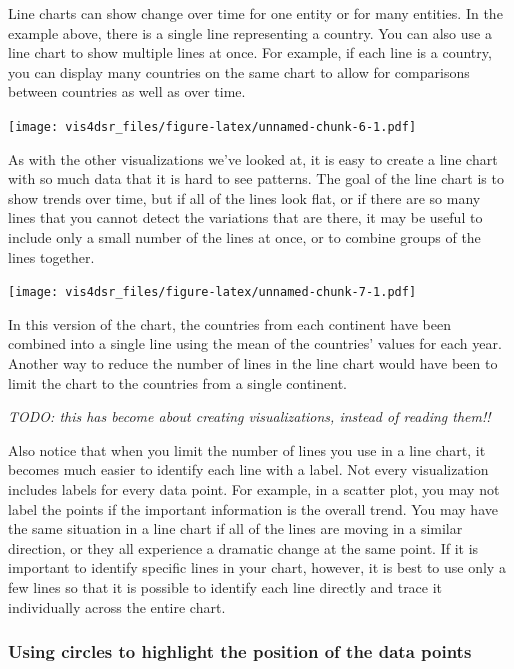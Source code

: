 \documentclass[
]{krantz}
\begin{document}
Line charts can show change over time for one entity or for many entities. In the example
above, there is a single line representing a country. You can also use a line chart
to show multiple lines at once. For example, if each line is a country, you can display
many countries on the same chart to allow for comparisons between countries as well as
over time.

\texttt{[image: vis4dsr\_files/figure-latex/unnamed-chunk-6-1.pdf]}

As with the other visualizations we've looked at, it is easy to create a line chart
with so much data that it is hard to see patterns. The goal of the line chart is to
show trends over time, but if all of the lines look flat, or if there are so many
lines that you cannot detect the variations that are there, it may be useful to include
only a small number of the lines at once, or to combine groups of the lines together.

\texttt{[image: vis4dsr\_files/figure-latex/unnamed-chunk-7-1.pdf]}

In this version of the chart, the countries from each continent have been combined
into a single line using the mean of the countries' values for each year. Another way to
reduce the number of lines in the line chart would have been to limit the chart to
the countries from a single continent.

\emph{TODO: this has become about creating visualizations, instead of reading them!!}

Also notice that when you limit the number of lines you use in a line chart, it
becomes much easier to identify each line with a label. Not every visualization
includes labels for every data point. For example, in a scatter plot, you may not
label the points if the important information is the overall trend. You may have
the same situation in a line chart if all of the lines are moving in a similar
direction, or they all experience a dramatic change at the same point. If it is
important to identify specific lines in your chart, however, it is best to use only
a few lines so that it is possible to identify each line directly and trace it
individually across the entire chart.

\hypertarget{using-circles-to-highlight-the-position-of-the-data-points}{%
\subsubsection{Using circles to highlight the position of the data points}\label{using-circles-to-highlight-the-position-of-the-data-points}}
\end{document}
